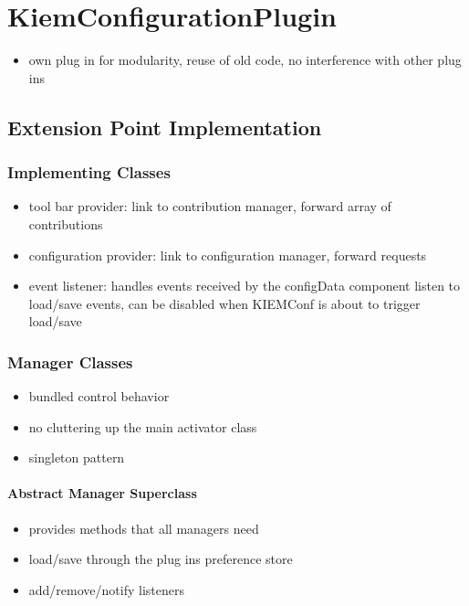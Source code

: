 \chapter{KiemConfigurationPlugin}
\label{chapter:KiemConfig}
\begin{itemize}
 \item own plug in for modularity, reuse of old code, no interference with other plug ins
\end{itemize}

\section{Extension Point Implementation}
\subsection{Implementing Classes}
\begin{itemize}
 \item tool bar provider: link to contribution manager, forward array of contributions
 \item configuration provider: link to configuration manager, forward requests
 \item event listener: handles events received by the configData component 
    listen to load/save events, can be disabled when KIEMConf is about to trigger load/save
\end{itemize}

\subsection{Manager Classes}
\begin{itemize}
 \item bundled control behavior 
 \item no cluttering up the main activator class
 \item singleton pattern
\end{itemize}
\subsubsection{Abstract Manager Superclass}
\begin{itemize}
 \item provides methods that all managers need
 \item load/save through the plug ins preference store
 \item add/remove/notify listeners
\end{itemize}

